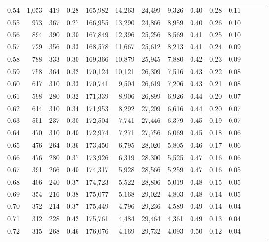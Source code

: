 \begin{tabular}{rrrrrrrrrrrrrr}
0.54 &  1,053 &  419 &  0.28 &  165,982 &   14,263 &  24,499 &   9,326 &  0.40 &  0.28 &      0.11 \\
0.55 &    973 &  367 &  0.27 &  166,955 &   13,290 &  24,866 &   8,959 &  0.40 &  0.26 &      0.10 \\
0.56 &    894 &  390 &  0.30 &  167,849 &   12,396 &  25,256 &   8,569 &  0.41 &  0.25 &      0.10 \\
0.57 &    729 &  356 &  0.33 &  168,578 &   11,667 &  25,612 &   8,213 &  0.41 &  0.24 &      0.09 \\
0.58 &    788 &  333 &  0.30 &  169,366 &   10,879 &  25,945 &   7,880 &  0.42 &  0.23 &      0.09 \\
0.59 &    758 &  364 &  0.32 &  170,124 &   10,121 &  26,309 &   7,516 &  0.43 &  0.22 &      0.08 \\
0.60 &    617 &  310 &  0.33 &  170,741 &    9,504 &  26,619 &   7,206 &  0.43 &  0.21 &      0.08 \\
0.61 &    598 &  280 &  0.32 &  171,339 &    8,906 &  26,899 &   6,926 &  0.44 &  0.20 &      0.07 \\
0.62 &    614 &  310 &  0.34 &  171,953 &    8,292 &  27,209 &   6,616 &  0.44 &  0.20 &      0.07 \\
0.63 &    551 &  237 &  0.30 &  172,504 &    7,741 &  27,446 &   6,379 &  0.45 &  0.19 &      0.07 \\
0.64 &    470 &  310 &  0.40 &  172,974 &    7,271 &  27,756 &   6,069 &  0.45 &  0.18 &      0.06 \\
0.65 &    476 &  264 &  0.36 &  173,450 &    6,795 &  28,020 &   5,805 &  0.46 &  0.17 &      0.06 \\
0.66 &    476 &  280 &  0.37 &  173,926 &    6,319 &  28,300 &   5,525 &  0.47 &  0.16 &      0.06 \\
0.67 &    391 &  266 &  0.40 &  174,317 &    5,928 &  28,566 &   5,259 &  0.47 &  0.16 &      0.05 \\
0.68 &    406 &  240 &  0.37 &  174,723 &    5,522 &  28,806 &   5,019 &  0.48 &  0.15 &      0.05 \\
0.69 &    354 &  216 &  0.38 &  175,077 &    5,168 &  29,022 &   4,803 &  0.48 &  0.14 &      0.05 \\
0.70 &    372 &  214 &  0.37 &  175,449 &    4,796 &  29,236 &   4,589 &  0.49 &  0.14 &      0.04 \\
0.71 &    312 &  228 &  0.42 &  175,761 &    4,484 &  29,464 &   4,361 &  0.49 &  0.13 &      0.04 \\
0.72 &    315 &  268 &  0.46 &  176,076 &    4,169 &  29,732 &   4,093 &  0.50 &  0.12 &      0.04 \\

\end{tabular}
